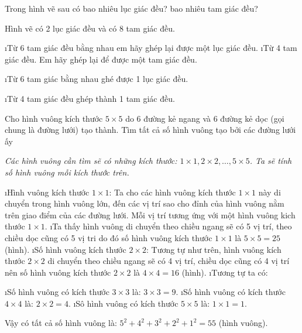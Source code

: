 \begin{bt}
	Trong hình vẽ sau có bao nhiêu lục giác đều? bao nhiêu tam giác đều?
	\begin{loigiaichuong34}
		Hình vẽ có 2 lục giác đều và có 8 tam giác đều.
	\end{loigiaichuong34}
\end{bt}
\begin{bt}
	\begin{enumerate}[a), leftmargin=*]
		\i Từ 6 tam giác đều bằng nhau em hãy ghép lại được một lục giác đều.
		\i Từ 4 tam giác đều. Em hãy ghép lại để được một tam giác đều. 
	\end{enumerate}
	\begin{loigiaichuong34}
		\begin{enumerate}[a), leftmargin=*]
			\i Từ 6 tam giác bằng nhau ghé được 1 lục giác đều.
			
			\i Từ 4 tam giác đều ghép thành 1 tam giác đều.

		\end{enumerate}
	\end{loigiaichuong34}
\end{bt}
\begin{bt}
	Cho hình vuông kích thước $5 \times 5$ do 6 đường kẻ ngang và 6 đường kẻ dọc (gọi chung là đường lưới) tạo thành. Tìm tất cả số hình vuông tạo bởi các đường lưới ấy
	\begin{loigiaichuong34}
		\textit{Các hình vuông cần tìm sẽ có những kích thước: $1\times 1, 2\times 2,\ldots, 5\times5$. Ta sẽ tính số hình vuông mỗi kích thước trên.}
		\begin{enumerate}[--, leftmargin=*]
			\i Hình vuông kích thước  $1\times 1$: Ta cho các hình vuông kích thước $1\times 1$  này di chuyển trong hình vuông lớn, đến các vị trí sao cho đỉnh của hình vuông nằm trên giao điểm của các đường lưới. Mỗi vị trí tương ứng với một hình vuông kich thước $ 1\times 1$.
			\i Ta thấy hình vuông di chuyển theo chiều ngang sẽ có 5 vị trí, theo chiều dọc cũng có 5 vị tri do đó số hình vuông kích thước $1\times 1$  là $5 \times 5 = 25$ (hình).
			\i Số hình vuông kích thước  $2 \times 2$: Tương tự như trên, hình vuông kích thước $2 \times 2$  di chuyển theo chiều ngang sẽ có 4 vị trí, chiều dọc cũng có 4 vị trí nên số hình vuông kích thước $2 \times 2$  là $4 \times 4 = 16$  (hình).
			\i Tương tự ta có: 
			\begin{enumerate}[+, leftmargin=*]
				\i Số hình vuông có kích thước $3 \times 3$ là: $3\times 3 = 9$.  
				\i Số hình vuông có kích thước $4 \times 4$ là: $2 \times 2 = 4$. 
				\i Sô hình vuông có kích thước $5 \times 5$ là: $1 \times 1 = 1$. 
			\end{enumerate}
		\end{enumerate}
		Vậy có tất cả số hình vuông là: $5^2 + 4^2 + 3^2 +2^2 + 1^2 = 55$ (hình vuông).
	\end{loigiaichuong34}
\end{bt}
